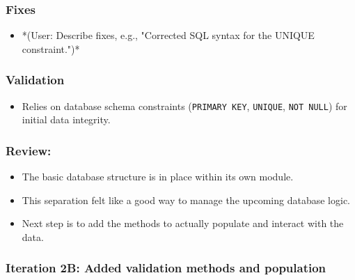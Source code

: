 \subsubsection{Fixes}
\begin{itemize}
	\item *(User: Describe fixes, e.g., "Corrected SQL syntax for the UNIQUE constraint.")*
\end{itemize}

\subsubsection{Validation}
\begin{itemize}
	\item Relies on database schema constraints (\verb|PRIMARY KEY|, \verb|UNIQUE|, \verb|NOT NULL|) for initial data integrity.
\end{itemize}

\subsubsection{Review:}
\begin{itemize}
	\item The basic database structure is in place within its own module.
	\item This separation felt like a good way to manage the upcoming database logic.
	\item Next step is to add the methods to actually populate and interact with the data.
\end{itemize}

\newpage

\subsubsection{Iteration 2B: Added validation methods and population}

